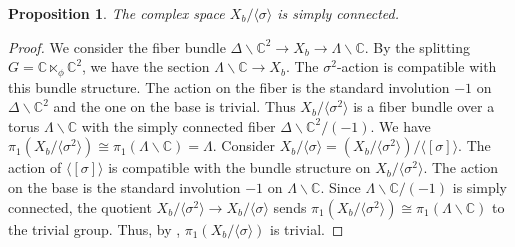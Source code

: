 \documentclass[12pt,reqno]{amsart}
\newtheorem{prop}[thm]{Proposition}
\theoremstyle{definition}
\newtheorem{obs}[thm]{Observation}
\newcommand{\Z}{\mathbb{Z}}
\newcommand{\C}{\mathbb{C}}
\begin{document}




\begin{prop}
 The complex space $X_{b}/\langle \sigma\rangle$ is simply connected.
\end{prop}

\begin{proof}
We consider the fiber bundle $\Delta \backslash \C^{2}\to X_{b}\to \Lambda  \backslash \C$.
By the splitting $G=\C\ltimes _{\phi}\C^{2}$, we have the section  $\Lambda  \backslash \C\to X_{b}$.
The $\sigma^2$-action is compatible with this bundle structure.
 The action on the fiber is the standard involution $-1$ on $\Delta \backslash \C^{2}$ and  the one on the base is trivial.
 Thus $X_{b}/\langle\sigma^2 \rangle$ is a fiber bundle over a torus $\Lambda  \backslash \C$ with the simply connected fiber $\Delta \backslash \C^{2}/(-1)$.
 We have $\pi_{1}(X_{b}/\langle \sigma^2\rangle)\cong \pi_{1}(\Lambda  \backslash \C)=\Lambda$.
Consider 
$X_{b}/\langle \sigma\rangle=(X_{b}/\langle \sigma^2\rangle)/\langle [\sigma]\rangle$.
The action of $\langle [\sigma]\rangle$ is compatible  with the  bundle structure on $X_{b}/\langle \sigma^2\rangle$.
The action on the base is  the standard involution $-1$ on $\Lambda  \backslash \C$.
Since $\Lambda  \backslash \C/ (-1)$ is simply connected,
the quotient $X_{b}/\langle \sigma^2\rangle\to X_{b}/\langle \sigma\rangle$ sends $\pi_{1}(X_{b}/\langle \sigma^2\rangle)\cong\pi_{1}(\Lambda  \backslash \C)$ to the trivial group.
Thus, by \cite[Corollary 6.3]{Bre},  $\pi_{1}(X_{b}/\langle \sigma\rangle)$ is trivial.
\end{proof}
\end{document}
